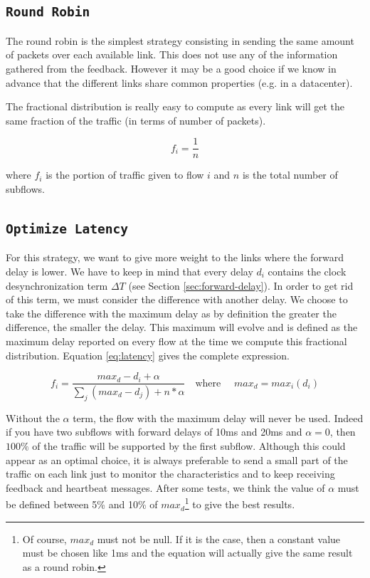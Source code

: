 \subsection{\texttt{Round Robin}}

The round robin is the simplest strategy consisting in sending the same amount of packets over each available link. This does not use any of the information gathered from the feedback. However it may be a good choice if we know in advance that the different links share common properties (e.g. in a datacenter).

The fractional distribution is really easy to compute as every link will get the same fraction of the traffic (in terms of number of packets).

\begin{equation*}
f_i = \frac{1}{n}
\end{equation*}

where $f_i$ is the portion of traffic given to flow $i$ and $n$ is the total number of subflows.

\subsection{\texttt{Optimize Latency}}

For this strategy, we want to give more weight to the links where the forward delay is lower. We have to keep in mind that every delay $d_i$ contains the clock desynchronization term $\Delta T$ (see Section \ref{sec:forward-delay}). In order to get rid of this term, we must consider the difference with another delay. We choose to take the difference with the maximum delay as by definition the greater the difference, the smaller the delay. This maximum will evolve and is defined as the maximum delay reported on every flow at the time we compute this fractional distribution. Equation \ref{eq:latency} gives the complete expression.  

\begin{equation}
f_i = \frac{max_d - d_i + \alpha}{\sum_j (max_d - d_j) + n*\alpha }\quad \text{where } \quad max_d = max_i(d_i) 
\label{eq:latency}
\end{equation}

Without the $\alpha$ term, the flow with the maximum delay will never be used. Indeed if you have two subflows with forward delays of 10ms and 20ms and $\alpha=0$, then $100\%$ of the traffic will be supported by the first subflow. Although this could appear as an optimal choice, it is always preferable to send a small part of the traffic on each link just to monitor the characteristics and to keep receiving feedback and heartbeat messages. After some tests, we think the value of $\alpha$ must be defined between 5\% and 10\% of $max_d$\footnote{Of course, $max_d$ must not be null. If it is the case, then a constant value must be chosen like 1ms and the equation will actually give the same result as a round robin.} to give the best results. 

